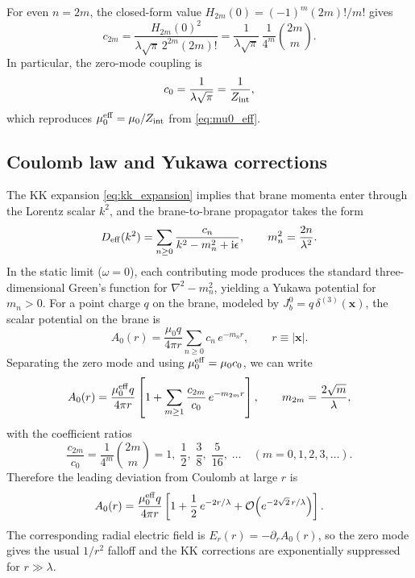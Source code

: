 \documentclass[11pt]{article}
\newcommand{\ii}{\mathrm i}
\newcommand{\J}{J}
\newcommand{\lam}{\lambda}      %
\newcommand{\Zint}{Z_{\rm int}} %
\newcommand{\muo}{\mu_0}
\newcommand{\mueff}{\mu_0^{\rm eff}}
\begin{document}
For even \(n=2m\), the closed-form value \(H_{2m}(0)=(-1)^m(2m)!/m!\) gives
\begin{equation}
  c_{2m}
  = \frac{H_{2m}(0)^2}{\lam\sqrt{\pi}\,2^{2m}(2m)!}
  = \frac{1}{\lam\sqrt{\pi}}\,
    \frac{1}{4^m}\binom{2m}{m}.
  \label{eq:cn_even_closed}
\end{equation}
In particular, the zero-mode coupling is
\begin{equation}
  c_0 = \frac{1}{\lam\sqrt{\pi}} = \frac{1}{\Zint},
\end{equation}
which reproduces \(\mueff=\muo/\Zint\) from \cref{eq:mu0_eff}.

\subsection{Coulomb law and Yukawa corrections}
\label{sec:yukawa}

The KK expansion \cref{eq:kk_expansion} implies that brane momenta enter through
the Lorentz scalar \(k^2\), and the brane-to-brane propagator takes the form
\begin{equation}
  D_{\rm eff}(k^2)
  = \sum_{n\ge 0}\frac{c_n}{k^2 - m_n^2 + \ii\epsilon},
  \qquad
  m_n^2=\frac{2n}{\lam^2}.
  \label{eq:Deff_explicit}
\end{equation}
In the static limit (\(\omega=0\)), each contributing mode produces the standard
three-dimensional Green's function for \(\nabla^2-m_n^2\), yielding a Yukawa
potential for \(m_n>0\). For a point charge \(q\) on the brane, modeled by
\(\J_b^0=q\,\delta^{(3)}(\mathbf x)\), the scalar potential on the brane is
\begin{equation}
  A_0(r)
  = \frac{\muo q}{4\pi r}\sum_{n\ge 0} c_n\,e^{-m_n r},
  \qquad r\equiv|\mathbf x|.
  \label{eq:A0_KK_sum}
\end{equation}
Separating the zero mode and using \(\mueff=\muo c_0\), we can write
\begin{equation}
  A_0(r)
  = \frac{\mueff q}{4\pi r}
    \left[
      1 + \sum_{m\ge 1}\frac{c_{2m}}{c_0}\,e^{-m_{2m} r}
    \right],
  \qquad
  m_{2m}=\frac{2\sqrt{m}}{\lam},
  \label{eq:A0_mu_eff_form}
\end{equation}
with the coefficient ratios
\begin{equation}
  \frac{c_{2m}}{c_0}
  = \frac{1}{4^m}\binom{2m}{m}
  = 1,\;\frac12,\;\frac{3}{8},\;\frac{5}{16},\;\ldots \quad (m=0,1,2,3,\ldots).
  \label{eq:ratio_cn}
\end{equation}
Therefore the leading deviation from Coulomb at large \(r\) is
\begin{equation}
  A_0(r)
  = \frac{\mueff q}{4\pi r}\left[1+\frac12\,e^{-2r/\lam}
    + \mathcal{O}\!\left(e^{-2\sqrt{2}\,r/\lam}\right)\right].
  \label{eq:leading_yukawa}
\end{equation}
The corresponding radial electric field is \(E_r(r)=-\partial_r A_0(r)\), so the
zero mode gives the usual \(1/r^2\) falloff and the KK corrections are exponentially
suppressed for \(r\gg\lam\).
\end{document}
